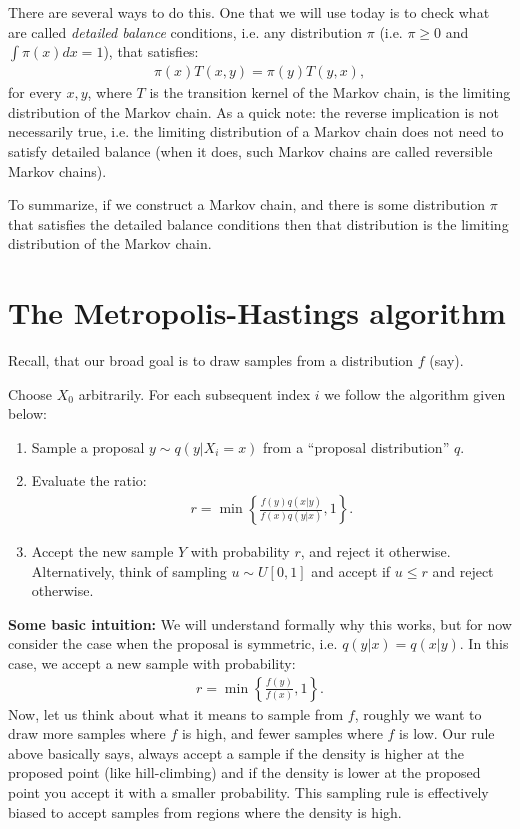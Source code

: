 \documentclass[twoside,12pt]{article}
\begin{document}
There are several ways to do this. One that we will use today is to check what are called \emph{detailed balance} conditions, i.e. any distribution $\pi$ (i.e. $\pi \geq 0$ and $\int \pi(x) dx = 1$), that satisfies:
\begin{align*}
\pi(x) T(x,y) = \pi(y) T(y,x),
\end{align*}
for every $x,y$, where $T$ is the transition kernel of the Markov chain, is the limiting distribution of the Markov chain. As a quick note: the reverse implication is not necessarily true, i.e. the limiting distribution of a Markov chain does not need to satisfy detailed balance (when it does, such Markov chains are called reversible Markov chains).

To summarize, if we construct a Markov chain, and there is some distribution $\pi$ that satisfies the detailed balance conditions then that distribution is the limiting distribution of the Markov chain.

\section{The Metropolis-Hastings algorithm}
Recall, that our broad goal is to draw samples from a distribution $f$ (say). 

Choose $X_0$ arbitrarily. For each subsequent index $i$ we follow the algorithm given below:
\begin{enumerate}
\item Sample a proposal $y \sim q(y | X_i = x)$ from a ``proposal distribution'' $q$.
\item Evaluate the ratio:
\begin{align*}
r = \min \left\{ \frac{f(y) q(x | y) } {f(x) q(y | x) }, 1 \right\}.
\end{align*}
\item Accept the new sample $Y$ with probability $r$, and reject it otherwise. Alternatively, think of sampling $u \sim U[0,1]$ and accept if $u \leq r$ and reject otherwise.
\end{enumerate}

{\bf Some basic intuition: } We will understand formally why this works, but for now consider the case when the proposal is symmetric, i.e. $q(y|x) = q(x|y)$. In this case, we accept a new sample with probability:
\begin{align*}
r = \min \left\{ \frac{f(y)} {f(x)}, 1 \right\}.
\end{align*}
Now, let us think about what it means to sample from $f$, roughly we want to draw more samples where $f$ is high, and fewer samples where $f$ is low. Our rule above basically says, always accept a sample if the density is higher at the proposed point (like hill-climbing) and if the density is lower at the proposed point you accept it with a smaller probability. This sampling rule is effectively biased to accept samples from regions where the density is high. 
\end{document}
